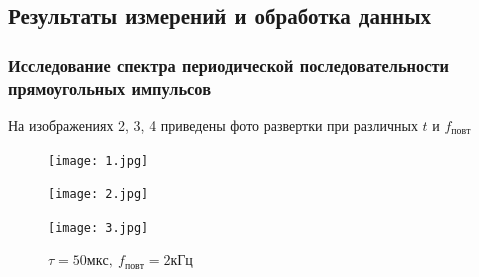 \documentclass[12pt,a4paper]{article}
\begin{document}



\subsection*{Результаты измерений и обработка данных}
\subsubsection*{Исследование спектра периодической последовательности прямоугольных импульсов}

На изображениях 2, 3, 4 приведены фото развертки при различных $t$ и $f_{повт}$ 


\begin{figure}[htp]
    \centering
    \texttt{[image: 1.jpg]}
    \caption[]{$\tau = 50мкс,\ f_{повт} = 1кГц$}

    \texttt{[image: 2.jpg]}
    \caption[]{$\tau = 100мкс,\ f_{повт} = 1кГц$}

    \texttt{[image: 3.jpg]}
    \caption[]{$\tau = 50мкс,\ f_{повт} = 2кГц$}
\end{figure}
\end{document}
